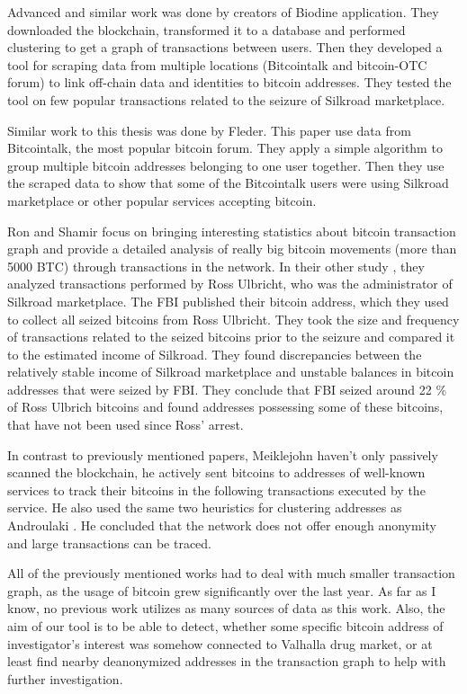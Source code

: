 \documentclass[
  digital, %
  table,   %
  lof,     %
  lot,     %
  oneside
]{fithesis3}
\begin{document}
Advanced and similar work \cite{spagnuolo2014bitiodine} was done by creators of Biodine application. They downloaded the blockchain, transformed it to
 a database and performed clustering to get a graph of transactions between users.
Then they developed a tool for scraping data from multiple locations (Bitcointalk and bitcoin-OTC forum) to link
off-chain data and identities to bitcoin addresses.
They tested the tool on few popular transactions related to the seizure of Silkroad marketplace.

Similar work \cite{fleder2015bitcoin} to this thesis was done by Fleder.
This paper use data from Bitcointalk, the most popular bitcoin forum. 
They apply a simple algorithm to group multiple bitcoin addresses belonging to one user together.
Then they use the scraped data to show
that some of the Bitcointalk users were using Silkroad marketplace or other popular services accepting bitcoin.
 
Ron and Shamir \cite{ron2013quantitative} focus on bringing
interesting statistics about bitcoin transaction graph
and provide a detailed analysis of really big bitcoin movements (more than 5000 BTC) 
through transactions in the network.
In their other study \cite{ron2014did}, they analyzed transactions performed by Ross Ulbricht,
who was the administrator of Silkroad marketplace.
The FBI published their bitcoin address, which they used to collect all seized bitcoins from Ross Ulbricht.
They took the size and frequency of transactions related to the seized bitcoins prior to the seizure and compared it to the estimated income of Silkroad. They found discrepancies between the 
relatively stable income of Silkroad marketplace and unstable balances in bitcoin addresses
that were seized by FBI. They conclude that FBI seized around 22 \% of Ross Ulbrich bitcoins
and found addresses possessing some of these bitcoins, that have not been used since Ross' arrest.

In contrast to previously mentioned papers, Meiklejohn \cite{meiklejohn2013fistful} 
haven't only passively scanned the blockchain, he actively sent bitcoins to addresses of
well-known services to track their bitcoins in the following transactions executed by the service.
He also used the same two heuristics for clustering addresses
as Androulaki \cite{androulaki2013evaluating}.
He concluded that the network does not offer enough anonymity and large transactions can be traced.

All of the previously mentioned works had to deal with much smaller transaction graph,
as the usage of bitcoin grew significantly over the last year. 
As far as I know,
no previous work utilizes as many sources of data as this work.
Also, the aim of our tool is to be able to detect, whether some specific bitcoin address of 
investigator's interest was somehow connected to Valhalla drug market, or at least find nearby
deanonymized addresses in the transaction graph to help with further investigation.
\end{document}

